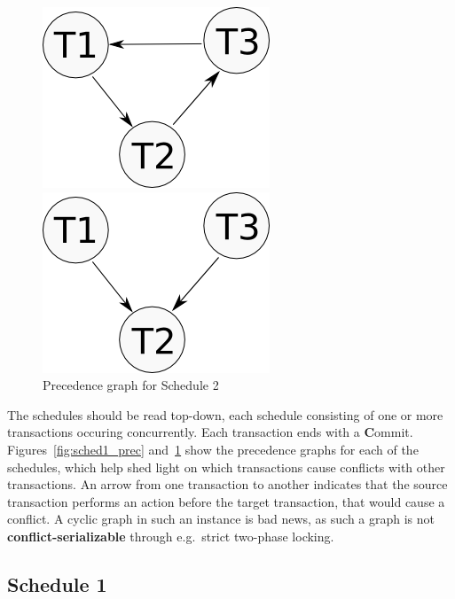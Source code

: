 \begin{figure}[!h]
    \begin{minipage}{.5\linewidth}
        \caption{Precedence graph for Schedule 1\label{fig:sched1_prec}}
        \includegraphics[scale=0.75]{images/sched1.png}
    \end{minipage}
    \begin{minipage}{.5\linewidth}
        \caption{Precedence graph for Schedule 2\label{fig:sched2_prec}}
        \includegraphics[scale=0.75]{images/sched2.png}
    \end{minipage}
\end{figure}

\FloatBarrier
The schedules should be read top-down, each schedule consisting of one or more
transactions occuring concurrently. Each transaction ends with a
\textbf{C}ommit. Figures~\ref{fig:sched1_prec} and~\ref{fig:sched2_prec} show
the precedence graphs for each of the schedules, which help shed light on which
transactions cause conflicts with other transactions. An arrow from one
transaction to another indicates that the source transaction performs an action
before the target transaction, that would cause a conflict. A cyclic graph in
such an instance is bad news, as such a graph is not
\textbf{conflict-serializable} through e.g.\ strict two-phase locking.


\subsection{Schedule 1}

